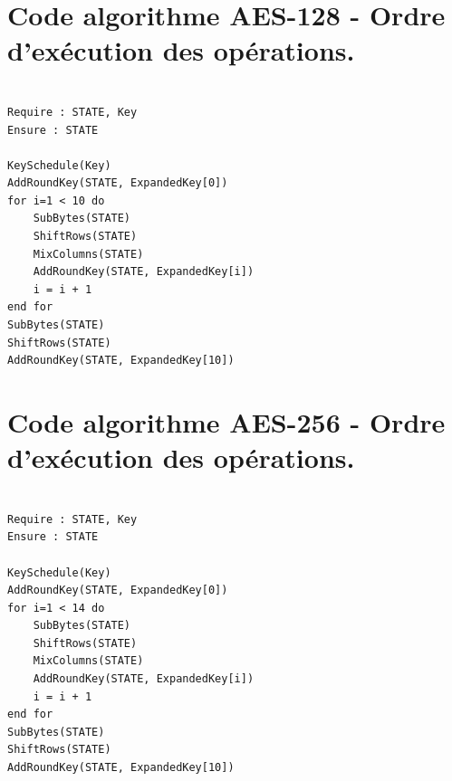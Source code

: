 \documentclass[oneside]{book}
\begin{document}
\begin{appendices}
\newpage


\section{Code algorithme AES-128 - Ordre d'exécution des opérations.}
\label{ann:AES128}
\lstset{language=Pascal}          %
\begin{lstlisting}[frame=single]  % Start your code-block

Require : STATE, Key
Ensure : STATE

KeySchedule(Key)
AddRoundKey(STATE, ExpandedKey[0])
for i=1 < 10 do
	SubBytes(STATE)
	ShiftRows(STATE)
	MixColumns(STATE)
	AddRoundKey(STATE, ExpandedKey[i])
	i = i + 1
end for
SubBytes(STATE)
ShiftRows(STATE)
AddRoundKey(STATE, ExpandedKey[10])
\end{lstlisting}

\newpage

\section{Code algorithme AES-256 - Ordre d'exécution des opérations.}
\label{ann:AES256}
\lstset{language=Pascal}          %
\begin{lstlisting}[frame=single]  % Start your code-block

Require : STATE, Key
Ensure : STATE

KeySchedule(Key)
AddRoundKey(STATE, ExpandedKey[0])
for i=1 < 14 do
	SubBytes(STATE)
	ShiftRows(STATE)
	MixColumns(STATE)
	AddRoundKey(STATE, ExpandedKey[i])
	i = i + 1
end for
SubBytes(STATE)
ShiftRows(STATE)
AddRoundKey(STATE, ExpandedKey[10])
\end{lstlisting}

\newpage



\end{appendices}
\end{document}
